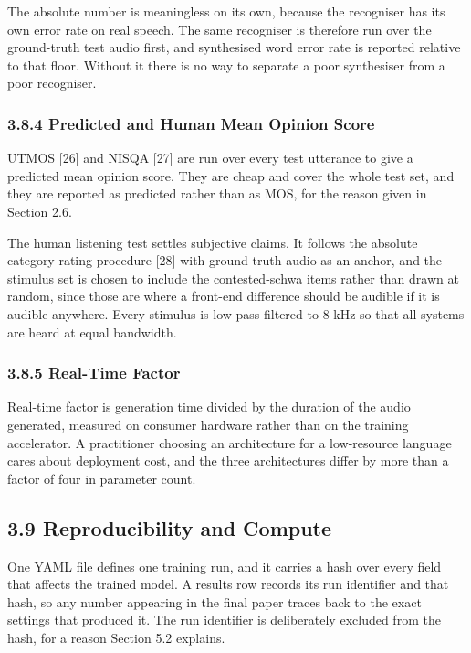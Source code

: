 \documentclass[12pt,a4paper]{article}
\begin{document}
The absolute number is meaningless on its own, because the recogniser has its own error rate on real speech. The same recogniser is therefore run over the ground-truth test audio first, and synthesised word error rate is reported relative to that floor. Without it there is no way to separate a poor synthesiser from a poor recogniser.

\subsubsection*{3.8.4  Predicted and Human Mean Opinion Score}
UTMOS [26] and NISQA [27] are run over every test utterance to give a predicted mean opinion score. They are cheap and cover the whole test set, and they are reported as predicted rather than as MOS, for the reason given in Section 2.6.

The human listening test settles subjective claims. It follows the absolute category rating procedure [28] with ground-truth audio as an anchor, and the stimulus set is chosen to include the contested-schwa items rather than drawn at random, since those are where a front-end difference should be audible if it is audible anywhere. Every stimulus is low-pass filtered to 8 kHz so that all systems are heard at equal bandwidth.

\subsubsection*{3.8.5  Real-Time Factor}
Real-time factor is generation time divided by the duration of the audio generated, measured on consumer hardware rather than on the training accelerator. A practitioner choosing an architecture for a low-resource language cares about deployment cost, and the three architectures differ by more than a factor of four in parameter count.

\subsection*{3.9  Reproducibility and Compute}
One YAML file defines one training run, and it carries a hash over every field that affects the trained model. A results row records its run identifier and that hash, so any number appearing in the final paper traces back to the exact settings that produced it. The run identifier is deliberately excluded from the hash, for a reason Section 5.2 explains.
\end{document}
